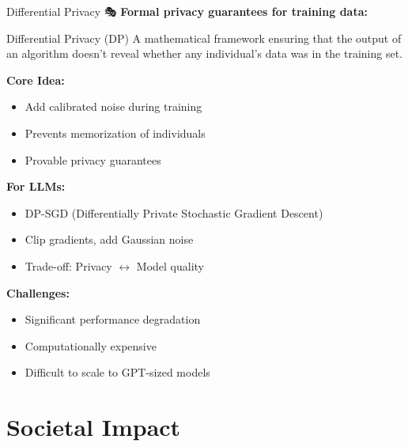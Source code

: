 \documentclass[aspectratio=169]{beamer}
\begin{document}
\begin{frame}[shrink=10]{Differential Privacy 🎭}
\small
\textbf{Formal privacy guarantees for training data:}

\vspace{0.5em}

\begin{block}{Differential Privacy (DP)}
A mathematical framework ensuring that the output of an algorithm doesn't reveal whether any individual's data was in the training set.
\end{block}

\vspace{0.5em}

\textbf{Core Idea:}
\begin{itemize}\setlength{\itemsep}{0pt}
    \item Add calibrated noise during training
    \item Prevents memorization of individuals
    \item Provable privacy guarantees
\end{itemize}

\vspace{0.5em}

\textbf{For LLMs:}
\begin{itemize}\setlength{\itemsep}{0pt}
    \item DP-SGD (Differentially Private Stochastic Gradient Descent)
    \item Clip gradients, add Gaussian noise
    \item Trade-off: Privacy $\leftrightarrow$ Model quality
\end{itemize}

\vspace{0.5em}

\textbf{Challenges:}
\begin{itemize}\setlength{\itemsep}{0pt}
    \item Significant performance degradation
    \item Computationally expensive
    \item Difficult to scale to GPT-sized models
\end{itemize}
\end{frame}

\section{Societal Impact}
\end{document}
